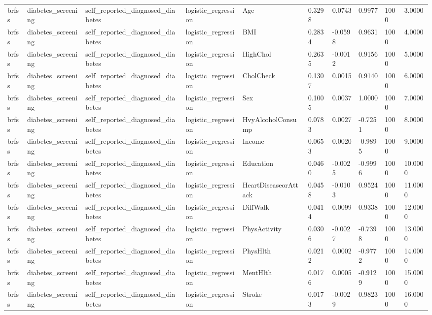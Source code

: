\begin{tabular}{llllllllll}
brfss & diabetes\_screening & self\_reported\_diagnosed\_diabetes & logistic\_regression & Age & 0.3298 & 0.0743 & 0.9977 & 1000 & 3.0000 \\
brfss & diabetes\_screening & self\_reported\_diagnosed\_diabetes & logistic\_regression & BMI & 0.2834 & -0.0598 & 0.9631 & 1000 & 4.0000 \\
brfss & diabetes\_screening & self\_reported\_diagnosed\_diabetes & logistic\_regression & HighChol & 0.2635 & -0.0012 & 0.9156 & 1000 & 5.0000 \\
brfss & diabetes\_screening & self\_reported\_diagnosed\_diabetes & logistic\_regression & CholCheck & 0.1307 & 0.0015 & 0.9140 & 1000 & 6.0000 \\
brfss & diabetes\_screening & self\_reported\_diagnosed\_diabetes & logistic\_regression & Sex & 0.1005 & 0.0037 & 1.0000 & 1000 & 7.0000 \\
brfss & diabetes\_screening & self\_reported\_diagnosed\_diabetes & logistic\_regression & HvyAlcoholConsump & 0.0783 & 0.0027 & -0.7251 & 1000 & 8.0000 \\
brfss & diabetes\_screening & self\_reported\_diagnosed\_diabetes & logistic\_regression & Income & 0.0653 & 0.0020 & -0.9895 & 1000 & 9.0000 \\
brfss & diabetes\_screening & self\_reported\_diagnosed\_diabetes & logistic\_regression & Education & 0.0460 & -0.0025 & -0.9996 & 1000 & 10.0000 \\
brfss & diabetes\_screening & self\_reported\_diagnosed\_diabetes & logistic\_regression & HeartDiseaseorAttack & 0.0458 & -0.0103 & 0.9524 & 1000 & 11.0000 \\
brfss & diabetes\_screening & self\_reported\_diagnosed\_diabetes & logistic\_regression & DiffWalk & 0.0414 & 0.0099 & 0.9338 & 1000 & 12.0000 \\
brfss & diabetes\_screening & self\_reported\_diagnosed\_diabetes & logistic\_regression & PhysActivity & 0.0306 & -0.0027 & -0.7398 & 1000 & 13.0000 \\
brfss & diabetes\_screening & self\_reported\_diagnosed\_diabetes & logistic\_regression & PhysHlth & 0.0212 & 0.0002 & -0.9772 & 1000 & 14.0000 \\
brfss & diabetes\_screening & self\_reported\_diagnosed\_diabetes & logistic\_regression & MentHlth & 0.0176 & 0.0005 & -0.9129 & 1000 & 15.0000 \\
brfss & diabetes\_screening & self\_reported\_diagnosed\_diabetes & logistic\_regression & Stroke & 0.0173 & -0.0029 & 0.9823 & 1000 & 16.0000 \\

\end{tabular}
